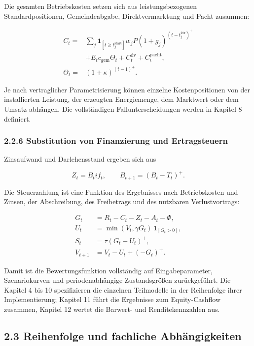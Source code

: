 \documentclass[
  a4paper,
  10pt]{article}
\begin{document}
Die gesamten Betriebskosten setzen sich aus leistungsbezogenen
Standardpositionen, Gemeindeabgabe, Direktvermarktung und Pacht
zusammen:

\[
\begin{aligned}
C_t
={}&\sum_j
\mathbf{1}_{[t\geq t_j^{\mathrm{start}}]}
 w_jP(1+g_j)^{(t-t_j^{\mathrm{idx}})^+}\\
&+E_t c_{\mathrm{gem}}\Theta_t
 +C_t^{\mathrm{dv}}
 +C_t^{\mathrm{pacht}},\\
\Theta_t
={}&(1+\kappa)^{(t-1)^+}.
\end{aligned}
\]

Je nach vertraglicher Parametrisierung können einzelne Kostenpositionen
von der installierten Leistung, der erzeugten Energiemenge, dem
Marktwert oder dem Umsatz abhängen. Die vollständigen
Fallunterscheidungen werden in Kapitel 8 definiert.

\hypertarget{substitution-von-finanzierung-und-ertragsteuern}{%
\subsubsection{2.2.6 Substitution von Finanzierung und
Ertragsteuern}\label{substitution-von-finanzierung-und-ertragsteuern}}

Zinsaufwand und Darlehensstand ergeben sich aus

\[
Z_t=B_t i f_t,
\qquad
B_{t+1}=(B_t-T_t)^+.
\]

Die Steuerzahlung ist eine Funktion des Ergebnisses nach Betriebskosten
und Zinsen, der Abschreibung, des Freibetrags und des nutzbaren
Verlustvortrags:

\[
\begin{aligned}
G_t
  &=R_t-C_t-Z_t-A_t-\Phi,\\
U_t
  &=\min(V_t,\gamma G_t)\,
    \mathbf{1}_{[G_t>0]},\\
S_t
  &=\tau(G_t-U_t)^+,\\
V_{t+1}
  &=V_t-U_t+(-G_t)^+.
\end{aligned}
\]

Damit ist die Bewertungsfunktion vollständig auf Eingabeparameter,
Szenariokurven und periodenabhängige Zustandsgrößen zurückgeführt. Die
Kapitel 4 bis 10 spezifizieren die einzelnen Teilmodelle in der
Reihenfolge ihrer Implementierung; Kapitel 11 führt die Ergebnisse zum
Equity-Cashflow zusammen, Kapitel 12 wertet die Barwert- und
Renditekennzahlen aus.

\hypertarget{reihenfolge-und-fachliche-abhuxe4ngigkeiten}{%
\subsection{2.3 Reihenfolge und fachliche
Abhängigkeiten}\label{reihenfolge-und-fachliche-abhuxe4ngigkeiten}}
\end{document}
